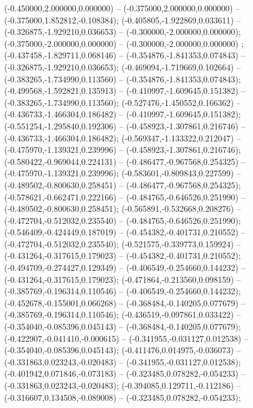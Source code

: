  (-0.450000,2.000000,0.000000) -- (-0.375000,2.000000,0.000000) -- (-0.375000,1.852812,-0.108384);
 (-0.405805,-1.922869,0.033611) -- (-0.326875,-1.929210,0.036653) -- (-0.300000,-2.000000,0.000000);
 (-0.375000,-2.000000,0.000000) -- (-0.300000,-2.000000,0.000000) ;
 (-0.437458,-1.829711,0.068146) -- (-0.354876,-1.841353,0.074843) -- (-0.326875,-1.929210,0.036653);
 (-0.469094,-1.719669,0.102664) -- (-0.383265,-1.734990,0.113560) -- (-0.354876,-1.841353,0.074843);
 (-0.499568,-1.592821,0.135913) -- (-0.410997,-1.609645,0.151382) -- (-0.383265,-1.734990,0.113560);
 (-0.527476,-1.450552,0.166362) -- (-0.436733,-1.466304,0.186482) -- (-0.410997,-1.609645,0.151382);
 (-0.551254,-1.295840,0.192306) -- (-0.458923,-1.307861,0.216746) -- (-0.436733,-1.466304,0.186482);
 (-0.569347,-1.133322,0.212047) -- (-0.475970,-1.139321,0.239996) -- (-0.458923,-1.307861,0.216746);
 (-0.580422,-0.969044,0.224131) -- (-0.486477,-0.967568,0.254325) -- (-0.475970,-1.139321,0.239996);
 (-0.583601,-0.809843,0.227599) -- (-0.489502,-0.800630,0.258451) -- (-0.486477,-0.967568,0.254325);
 (-0.578621,-0.662471,0.222166) -- (-0.484765,-0.646526,0.251990) -- (-0.489502,-0.800630,0.258451);
 (-0.565891,-0.532668,0.208276) -- (-0.472704,-0.512032,0.235540) -- (-0.484765,-0.646526,0.251990);
 (-0.546409,-0.424449,0.187019) -- (-0.454382,-0.401731,0.210552) -- (-0.472704,-0.512032,0.235540);
 (-0.521575,-0.339773,0.159924) -- (-0.431264,-0.317615,0.179023) -- (-0.454382,-0.401731,0.210552);
 (-0.494709,-0.274427,0.129349) -- (-0.406549,-0.254660,0.144232) -- (-0.431264,-0.317615,0.179023);
 (-0.471864,-0.213560,0.098159) -- (-0.385769,-0.196314,0.110546) -- (-0.406549,-0.254660,0.144232);
 (-0.452678,-0.155001,0.066268) -- (-0.368484,-0.140205,0.077679) -- (-0.385769,-0.196314,0.110546);
 (-0.436519,-0.097861,0.033422) -- (-0.354040,-0.085396,0.045143) -- (-0.368484,-0.140205,0.077679);
 (-0.422907,-0.041410,-0.000615) -- (-0.341955,-0.031127,0.012538) -- (-0.354040,-0.085396,0.045143);
 (-0.411476,0.014975,-0.036073) -- (-0.331863,0.023243,-0.020483) -- (-0.341955,-0.031127,0.012538);
 (-0.401942,0.071846,-0.073183) -- (-0.323485,0.078282,-0.054233) -- (-0.331863,0.023243,-0.020483);
 (-0.394085,0.129711,-0.112186) -- (-0.316607,0.134508,-0.089008) -- (-0.323485,0.078282,-0.054233);
